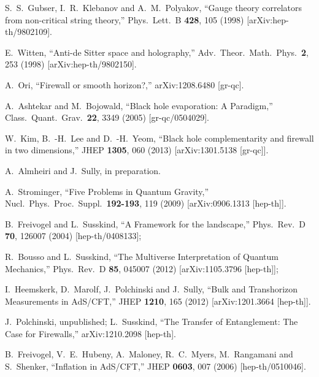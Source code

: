 \documentclass[12pt]{article}
\begin{document}
{\begin{thebibliography}{99}
  S.~S.~Gubser, I.~R.~Klebanov and A.~M.~Polyakov,
  ``Gauge theory correlators from non-critical string theory,''
  Phys.\ Lett.\  B {\bf 428}, 105 (1998)
  [arXiv:hep-th/9802109].

  E.~Witten,
  ``Anti-de Sitter space and holography,''
  Adv.\ Theor.\ Math.\ Phys.\  {\bf 2}, 253 (1998)
  [arXiv:hep-th/9802150].


  A.~Ori,
  ``Firewall or smooth horizon?,''
  arXiv:1208.6480 [gr-qc].

  A.~Ashtekar and M.~Bojowald,
  ``Black hole evaporation: A Paradigm,''
  Class.\ Quant.\ Grav.\  {\bf 22}, 3349 (2005)
  [gr-qc/0504029].
  
  W.~Kim, B.~-H.~Lee and D.~-H.~Yeom,
  ``Black hole complementarity and firewall in two dimensions,''
  JHEP {\bf 1305}, 060 (2013)
  [arXiv:1301.5138 [gr-qc]].
  
A.~Almheiri and J.~Sully, in preparation.

  A.~Strominger,
  ``Five Problems in Quantum Gravity,''
  Nucl.\ Phys.\ Proc.\ Suppl.\  {\bf 192-193}, 119 (2009)
  [arXiv:0906.1313 [hep-th]].

  B.~Freivogel and L.~Susskind,
  ``A Framework for the landscape,''
  Phys.\ Rev.\ D {\bf 70}, 126007 (2004)
  [hep-th/0408133];

  R.~Bousso and L.~Susskind,
  ``The Multiverse Interpretation of Quantum Mechanics,''
  Phys.\ Rev.\ D {\bf 85}, 045007 (2012)
  [arXiv:1105.3796 [hep-th]];

  I.~Heemskerk, D.~Marolf, J.~Polchinski and J.~Sully,
  ``Bulk and Transhorizon Measurements in AdS/CFT,''
  JHEP {\bf 1210}, 165 (2012)
  [arXiv:1201.3664 [hep-th]].

J.~Polchinski, unpublished;
  L.~Susskind,
  ``The Transfer of Entanglement: The Case for Firewalls,''
  arXiv:1210.2098 [hep-th].

  B.~Freivogel, V.~E.~Hubeny, A.~Maloney, R.~C.~Myers, M.~Rangamani and S.~Shenker,
  ``Inflation in AdS/CFT,''
  JHEP {\bf 0603}, 007 (2006)
  [hep-th/0510046].


\end{thebibliography}}
\end{document}
